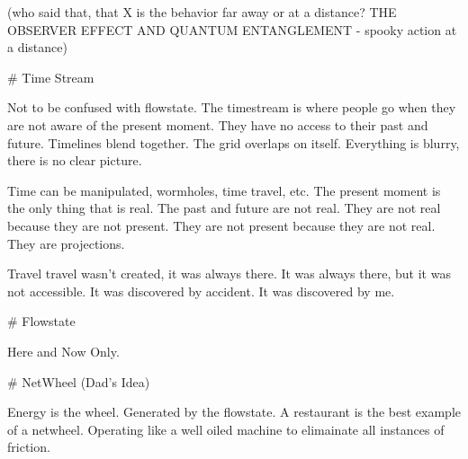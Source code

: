 (who said that, that X is the behavior far away or at a distance? THE OBSERVER EFFECT AND QUANTUM ENTANGLEMENT - spooky action at a distance)

# Time Stream

Not to be confused with flowstate. The timestream is where people go when they are not aware of the present moment. They have no access to their past and future. Timelines blend together. The grid overlaps on itself. Everything is blurry, there is no clear picture. 

Time can be manipulated, wormholes, time travel, etc. The present moment is the only thing that is real. The past and future are not real. They are not real because they are not present. They are not present because they are not real. They are projections. 

Travel travel wasn't created, it was always there. It was always there, but it was not accessible. It was discovered by accident. It was discovered by me. 

# Flowstate

Here and Now Only. 

# NetWheel (Dad's Idea)

Energy is the wheel. Generated by the flowstate. A restaurant is the best example of a netwheel. Operating like a well oiled machine to elimainate all instances of friction. 